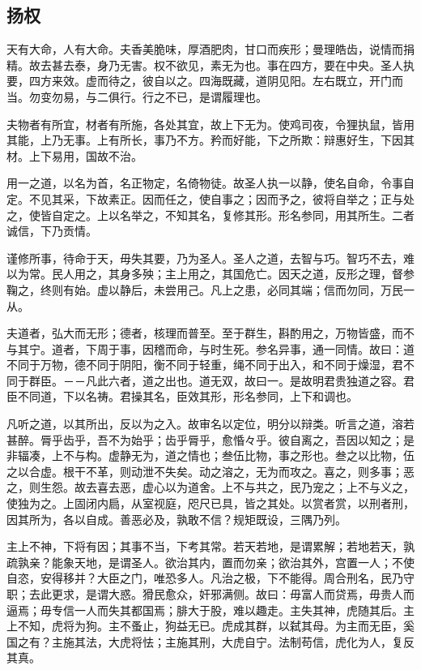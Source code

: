 \documentclass[]{article}
\begin{document}
\hypertarget{header-n850}{%
\subsection{扬权}\label{header-n850}}

天有大命，人有大命。夫香美脆味，厚酒肥肉，甘口而疾形；曼理皓齿，说情而捐精。故去甚去泰，身乃无害。权不欲见，素无为也。事在四方，要在中央。圣人执要，四方来效。虚而待之，彼自以之。四海既藏，道阴见阳。左右既立，开门而当。勿变勿易，与二俱行。行之不已，是谓履理也。

夫物者有所宜，材者有所施，各处其宜，故上下无为。使鸡司夜，令狸执鼠，皆用其能，上乃无事。上有所长，事乃不方。矜而好能，下之所欺：辩惠好生，下因其材。上下易用，国故不治。

用一之道，以名为首，名正物定，名倚物徒。故圣人执一以静，使名自命，令事自定。不见其采，下故素正。因而任之，使自事之；因而予之，彼将自举之；正与处之，使皆自定之。上以名举之，不知其名，复修其形。形名参同，用其所生。二者诚信，下乃贡情。

谨修所事，待命于天，毋失其要，乃为圣人。圣人之道，去智与巧。智巧不去，难以为常。民人用之，其身多殃；主上用之，其国危亡。因天之道，反形之理，督参鞠之，终则有始。虚以静后，未尝用己。凡上之患，必同其端；信而勿同，万民一从。

夫道者，弘大而无形；德者，核理而普至。至于群生，斟酌用之，万物皆盛，而不与其宁。道者，下周于事，因稽而命，与时生死。参名异事，通一同情。故曰：道不同于万物，德不同于阴阳，衡不同于轻重，绳不同于出入，和不同于燥湿，君不同于群臣。－－凡此六者，道之出也。道无双，故曰一。是故明君贵独道之容。君臣不同道，下以名祷。君操其名，臣效其形，形名参同，上下和调也。

凡听之道，以其所出，反以为之入。故审名以定位，明分以辩类。听言之道，溶若甚醉。脣乎齿乎，吾不为始乎；齿乎脣乎，愈惛々乎。彼自离之，吾因以知之；是非辐凑，上不与构。虚静无为，道之情也；叁伍比物，事之形也。叁之以比物，伍之以合虚。根干不革，则动泄不失矣。动之溶之，无为而攻之。喜之，则多事；恶之，则生怨。故去喜去恶，虚心以为道舍。上不与共之，民乃宠之；上不与义之，使独为之。上固闭内扃，从室视庭，咫尺已具，皆之其处。以赏者赏，以刑者刑，因其所为，各以自成。善恶必及，孰敢不信？规矩既设，三隅乃列。

主上不神，下将有因；其事不当，下考其常。若天若地，是谓累解；若地若天，孰疏孰亲？能象天地，是谓圣人。欲治其内，置而勿亲；欲治其外，宫置一人；不使自恣，安得移并？大臣之门，唯恐多人。凡治之极，下不能得。周合刑名，民乃守职；去此更求，是谓大惑。猾民愈众，奸邪满侧。故曰：毋富人而贷焉，毋贵人而逼焉；毋专信一人而失其都国焉；腓大于股，难以趣走。主失其神，虎随其后。主上不知，虎将为狗。主不蚤止，狗益无已。虎成其群，以弑其母。为主而无臣，奚国之有？主施其法，大虎将怯；主施其刑，大虎自宁。法制苟信，虎化为人，复反其真。
\end{document}
